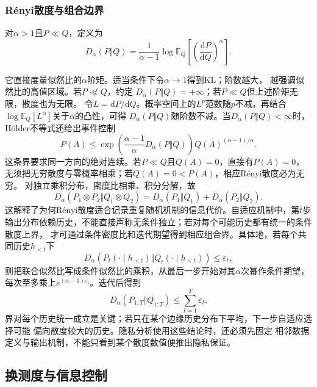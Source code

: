 \subsubsection{R\'enyi散度与组合边界}
\begin{definition}[高于一阶的Rényi散度]
  \label{def:information-renyi-divergence}
对\(\alpha>1\)且\(P\ll Q\)，定义为
\begin{equation}
  D_\alpha(P\Vert Q)
  =
  \frac{1}{\alpha-1}
  \log\mathbb{E}_Q\!\left[
    \left(\frac{\mathrm{d}P}{\mathrm{d}Q}\right)^\alpha
  \right].
  \label{eq:information-renyi-divergence}
\end{equation}
\end{definition}
它直接度量似然比的\(\alpha\)阶矩。适当条件下令\(\alpha\to1\)得到KL；阶数越大，
越强调似然比的高值区域。若\(P\not\ll Q\)，约定
\(D_\alpha(P\Vert Q)=+\infty\)；若\(P\ll Q\)但上述阶矩无限，散度也为无限。
令\(L=\mathrm{d}P/\mathrm{d}Q\)。概率空间上的\(L^p\)范数随\(p\)不减，再结合
\(\log\mathbb{E}_Q[L^\alpha]\)关于\(\alpha\)的凸性，可得
\(D_\alpha(P\Vert Q)\)随阶数不减。当\(D_\alpha(P\Vert Q)<\infty\)时，
H\"older不等式还给出事件控制
\begin{equation}
  P(A)
  \leq
  \exp\!\left(
    \frac{\alpha-1}{\alpha}D_\alpha(P\Vert Q)
  \right)
  Q(A)^{(\alpha-1)/\alpha}.
  \label{eq:information-renyi-event-bound}
\end{equation}
这条界要求同一方向的绝对连续。若\(P\ll Q\)且\(Q(A)=0\)，直接有\(P(A)=0\)，
无须把无穷散度与零概率相乘；若\(Q(A)=0<P(A)\)，相应R\'enyi散度必为无穷。
对独立乘积分布，密度比相乘、积分分解，故
\[
  D_\alpha(P_1\otimes P_2\Vert Q_1\otimes Q_2)
  =
  D_\alpha(P_1\Vert Q_1)+D_\alpha(P_2\Vert Q_2).
\]
这解释了为何R\'enyi散度适合记录重复随机机制的信息代价。自适应机制中，第\(t\)步
输出分布依赖历史，不能直接声称无条件独立；若对每个可能历史都有统一的条件散度上界，
才可通过条件密度比和迭代期望得到相应组合界。具体地，若每个共同历史\(h_{<t}\)下
\[
  D_\alpha\!\left(
    P_t(\cdot\mid h_{<t})\Vert Q_t(\cdot\mid h_{<t})
  \right)
  \leq\varepsilon_t,
\]
则把联合似然比写成条件似然比的乘积，从最后一步开始对其\(\alpha\)次幂作条件期望，
每次至多乘上\(e^{(\alpha-1)\varepsilon_t}\)。迭代后得到
\[
  D_\alpha(P_{1:T}\Vert Q_{1:T})
  \leq\sum_{t=1}^{T}\varepsilon_t.
\]
界对每个历史统一成立是关键；若只在某个边缘历史分布下平均，下一步自适应选择可能
偏向散度较大的历史。隐私分析使用这些结论时，还必须先固定
相邻数据定义与输出机制，不能只看到某个散度数值便推出隐私保证。
\subsection{换测度与信息控制}
\label{sec:information-change-measure}
